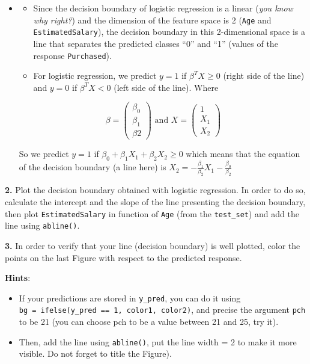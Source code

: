 \documentclass[]{book}
\providecommand{\tightlist}{%
  \setlength{\itemsep}{0pt}\setlength{\parskip}{0pt}}
\newenvironment{rmdblock}[1]
  {\begin{shaded*}
  \begin{itemize}
  \renewcommand{\labelitemi}{
    \raisebox{-.7\height}[0pt][0pt]{
      {\setkeys{Gin}{width=2em,keepaspectratio}\texttt{[image: img/icons/\#1]}}
    }
  }
  \item
  }
  {
  \end{itemize}
  \end{shaded*}
  }
\newenvironment{rmdinsight}
  {\begin{rmdblock}{insight}}
  {\end{rmdblock}}
\theoremstyle{definition}
\theoremstyle{definition}
\theoremstyle{definition}
\theoremstyle{remark}
\begin{document}
\begin{rmdinsight}
\begin{itemize}
\tightlist
\item
  Since the decision boundary of logistic regression is a linear
  (\emph{you know why right?}) and the dimension of the feature space is
  2 (\texttt{Age} and \texttt{EstimatedSalary}), the decision boundary
  in this 2-dimensional space is a line that separates the predicted
  classes ``0'' and ``1'' (values of the response \texttt{Purchased}).
\item
  For logistic regression, we predict \(y=1\) if \(\beta^T X \geq 0\)
  (right side of the line) and \(y=0\) if \(\beta^T X < 0\) (left side
  of the line). Where
\end{itemize}

\[ \beta = \begin{pmatrix} \beta_0 \\ \beta_1 \\ \beta2 \end{pmatrix} \,\, \text{and} \,\, X = \begin{pmatrix}
  1 \\
  X_1 \\
  X_2
  \end{pmatrix}\]

So we predict \(y=1\) if \(\beta_0 + \beta_1 X_1 + \beta_2 X_2 \geq 0\)
which means that the equation of the decision boundary (a line here) is
\(X_2 = - \frac{\beta_1}{\beta_2}X_1 - \frac{\beta_0}{\beta_2}\)
\end{rmdinsight}

\textbf{2.} Plot the decision boundary obtained with logistic
regression. In order to do so, calculate the intercept and the slope of
the line presenting the decision boundary, then plot
\texttt{EstimatedSalary} in function of \texttt{Age} (from the
\texttt{test\_set}) and add the line using \texttt{abline()}.

\textbf{3.} In order to verify that your line (decision boundary) is
well plotted, color the points on the last Figure with respect to the
predicted response.

\textbf{Hints}:

\begin{itemize}
\tightlist
\item
  If your predictions are stored in \texttt{y\_pred}, you can do it
  using
  \texttt{bg\ =\ ifelse(y\_pred\ ==\ 1,\ \textquotesingle{}color1\textquotesingle{},\ \textquotesingle{}color2\textquotesingle{})},
  and precise the argument \texttt{pch} to be 21 (you can choose pch to
  be a value between 21 and 25, try it).
\item
  Then, add the line using \texttt{abline()}, put the line width = 2 to
  make it more visible. Do not forget to title the Figure).
\end{itemize}
\end{document}
